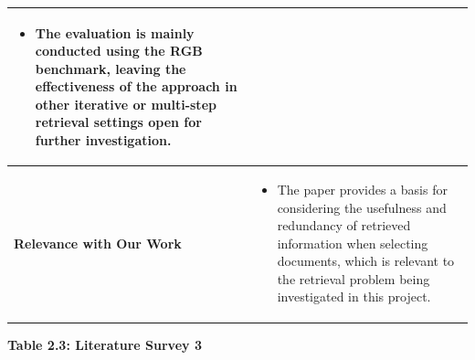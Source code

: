 \documentclass[12pt,a4paper]{report}
\begin{document}
\begin{longtable}{|p{1.25in}|p{5.15in}|}
\begin{itemize}[
    leftmargin=0.18in,
    itemsep=0.05in,
    topsep=0pt,
    parsep=0pt
]
    \item The evaluation is mainly conducted using the RGB benchmark, leaving the effectiveness of the approach in other iterative or multi-step retrieval settings open for further investigation.
\end{itemize}
\\ \hline

\textbf{Relevance with Our Work} &
\begin{itemize}[
    leftmargin=0.18in,
    itemsep=0.05in,
    topsep=0pt,
    parsep=0pt
]
    \item The paper provides a basis for considering the usefulness and redundancy of retrieved information when selecting documents, which is relevant to the retrieval problem being investigated in this project.
\end{itemize}
\\ \hline

\end{longtable}

\clearpage



\begin{center}
\textbf{Table 2.3: Literature Survey 3}
\end{center}
\end{document}
